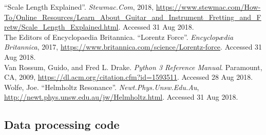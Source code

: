 \documentclass{article}
\begin{document}
\begin{hangparas}{.25in}{1}
``Scale Length Explained''. \textit{Stewmac.Com}, 2018, 
\url{https://www.stewmac.com/How-To/Online_Resources/Learn_About_Guitar_and_Instrument_Fretting_and_Fretw/Scale_Length_Explained.html}. Accessed 31 Aug 2018.\\

The Editors of Encyclopaedia Britannica. ``Lorentz Force''. 
\textit{Encyclopædia Britannica}, 2017, 
\url{https://www.britannica.com/science/Lorentz-force}. Accessed 31 Aug 2018.\\

Van Rossum, Guido, and Fred L. Drake. \textit{Python 3 Reference Manual}. 
Paramount, CA, 2009, \url{https://dl.acm.org/citation.cfm?id=1593511}. 
Accessed 28 Aug 2018.\\

Wolfe, Joe. ``Helmholtz Resonance''. \textit{Newt.Phys.Unsw.Edu.Au}, 
\url{http://newt.phys.unsw.edu.au/jw/Helmholtz.html}. Accessed 31 Aug 2018.\\

\end{hangparas}
\pagebreak
\begin{appendices}

	\section*{Data processing code}
	
	
	
	
	
	

\end{appendices}
\end{document}
